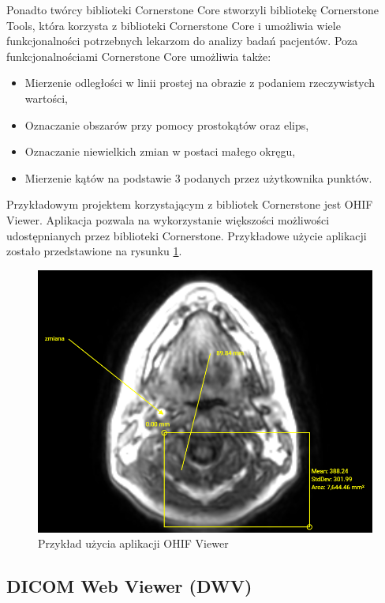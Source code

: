 \documentclass[a4paper,11pt,twoside,openright]{report}
\theoremstyle{definition}
\begin{document}
Ponadto twórcy biblioteki Cornerstone Core stworzyli bibliotekę Cornerstone Tools, która korzysta z biblioteki Cornerstone Core i umożliwia wiele funkcjonalności potrzebnych lekarzom do analizy badań pacjentów. Poza funkcjonalnościami Cornerstone Core umożliwia także:

\begin{itemize}[noitemsep]
\item Mierzenie odległości w linii prostej na obrazie z podaniem rzeczywistych wartości,
\item Oznaczanie obszarów przy pomocy prostokątów oraz elips,
\item Oznaczanie niewielkich zmian w postaci małego okręgu,
\item Mierzenie kątów na podstawie 3 podanych przez użytkownika punktów.
\end{itemize}

Przykładowym projektem korzystającym z bibliotek Cornerstone jest OHIF Viewer. Aplikacja pozwala na wykorzystanie większości możliwości udostępnianych przez biblioteki Cornerstone. Przykładowe użycie aplikacji zostało przedstawione na rysunku \ref{fig:OHIF-example}.

\begin{figure}[h]
	\includegraphics[width=\textwidth]{OHIF-example}
	\caption{Przykład użycia aplikacji OHIF Viewer}
    	\label{fig:OHIF-example}
\end{figure}

\subsection {DICOM Web Viewer (DWV)}
\end{document}

